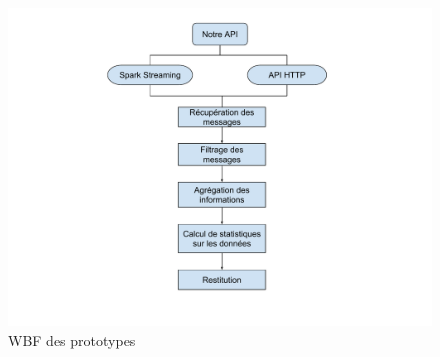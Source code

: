   \begin{figure}
    \centering
    \includegraphics[width=1\textwidth]{images/WBS.pdf}
    \caption{WBF des prototypes}
    \label{WBS}
  \end{figure}
